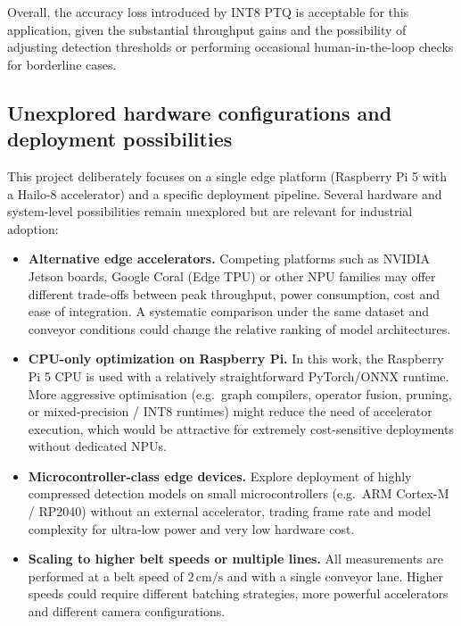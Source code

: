 \documentclass[12pt,a4paper]{report}
\begin{document}
Overall, the accuracy loss introduced by INT8 PTQ is acceptable for this application,
given the substantial throughput gains and the possibility of adjusting detection thresholds
or performing occasional human-in-the-loop checks for borderline cases.

\subsection{Unexplored hardware configurations and deployment possibilities}

This project deliberately focuses on a single edge platform (Raspberry Pi 5 with a Hailo-8
accelerator) and a specific deployment pipeline.
Several hardware and system-level possibilities remain unexplored but are relevant for
industrial adoption:

\begin{itemize}[leftmargin=1.5em]
    \item \textbf{Alternative edge accelerators.}
          Competing platforms such as NVIDIA Jetson boards, Google Coral (Edge TPU) or
          other NPU families may offer different trade-offs between peak throughput,
          power consumption, cost and ease of integration.
          A systematic comparison under the same dataset and conveyor conditions could
          change the relative ranking of model architectures.

    \item \textbf{CPU-only optimization on Raspberry Pi.}
          In this work, the Raspberry Pi 5 CPU is used with a relatively straightforward
          PyTorch/ONNX runtime.
          More aggressive optimisation (e.g.\ graph compilers, operator fusion, pruning,
          or mixed-precision / INT8 runtimes) might reduce the need of accelerator
          execution, which would be attractive for extremely cost-sensitive deployments
          without dedicated NPUs.

    \item \textbf{Microcontroller-class edge devices.}
      Explore deployment of highly compressed detection models on small microcontrollers
      (e.g.\ ARM Cortex-M / RP2040) without an external accelerator, trading frame rate and
      model complexity for ultra-low power and very low hardware cost.

    \item \textbf{Scaling to higher belt speeds or multiple lines.}
          All measurements are performed at a belt speed of \(2\,\text{cm/s}\) and with a
          single conveyor lane. Higher speeds could require different
          batching strategies, more powerful accelerators and different camera configurations.
\end{itemize}
\end{document}
